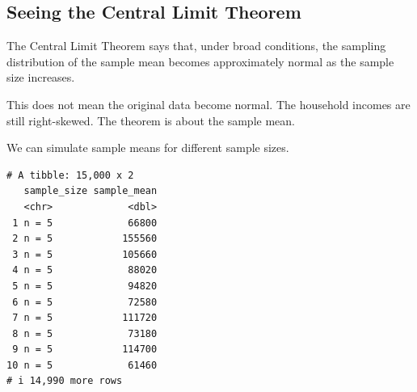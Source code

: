 \documentclass[
  letterpaper,
  DIV=11,
  numbers=noendperiod]{scrreprt}
\newenvironment{Shaded}{\begin{snugshade}}{\end{snugshade}}
\newcommand{\AttributeTok}[1]{\textcolor[rgb]{0.40,0.45,0.13}{#1}}
\newcommand{\DecValTok}[1]{\textcolor[rgb]{0.68,0.00,0.00}{#1}}
\newcommand{\FunctionTok}[1]{\textcolor[rgb]{0.28,0.35,0.67}{#1}}
\newcommand{\NormalTok}[1]{\textcolor[rgb]{0.00,0.23,0.31}{#1}}
\newcommand{\OtherTok}[1]{\textcolor[rgb]{0.00,0.23,0.31}{#1}}
\newcommand{\SpecialCharTok}[1]{\textcolor[rgb]{0.37,0.37,0.37}{#1}}
\newcommand{\StringTok}[1]{\textcolor[rgb]{0.13,0.47,0.30}{#1}}
\begin{document}
\subsection{Seeing the Central Limit
Theorem}\label{seeing-the-central-limit-theorem}

The Central Limit Theorem says that, under broad conditions, the
sampling distribution of the sample mean becomes approximately normal as
the sample size increases.

This does not mean the original data become normal. The household
incomes are still right-skewed. The theorem is about the sample mean.

We can simulate sample means for different sample sizes.

\begin{Shaded}
\end{Shaded}

\begin{verbatim}
# A tibble: 15,000 x 2
   sample_size sample_mean
   <chr>             <dbl>
 1 n = 5             66800
 2 n = 5            155560
 3 n = 5            105660
 4 n = 5             88020
 5 n = 5             94820
 6 n = 5             72580
 7 n = 5            111720
 8 n = 5             73180
 9 n = 5            114700
10 n = 5             61460
# i 14,990 more rows
\end{verbatim}
\end{document}
